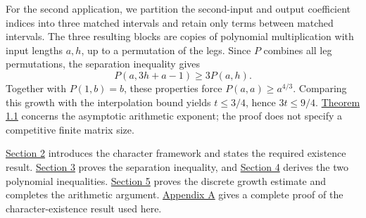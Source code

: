 For the second application, we partition the second-input and output coefficient indices into three matched intervals and retain only terms between matched intervals. The three resulting blocks are copies of polynomial multiplication with input lengths $a,h$, up to a permutation of the legs. Since $P$ combines all leg permutations, the separation inequality gives
\[
P(a,3h+a-1)\ge3P(a,h).
\]
Together with $P(1,b)=b$, these properties force $P(a,a)\ge a^{4/3}$. Comparing this growth with the interpolation bound yields $t\le3/4$, hence $3t\le9/4$. \hyperlink{p107.result.1.1}{Theorem 1.1} concerns the asymptotic arithmetic exponent; the proof does not specify a competitive finite matrix size.

\hyperlink{p107.sec.2}{Section 2} introduces the character framework and states the required existence result. \hyperlink{p107.sec.3}{Section 3} proves the separation inequality, and \hyperlink{p107.sec.4}{Section 4} derives the two polynomial inequalities. \hyperlink{p107.sec.5}{Section 5} proves the discrete growth estimate and completes the arithmetic argument. \hyperlink{p107.sec.A}{Appendix A} gives a complete proof of the character-existence result used here.
